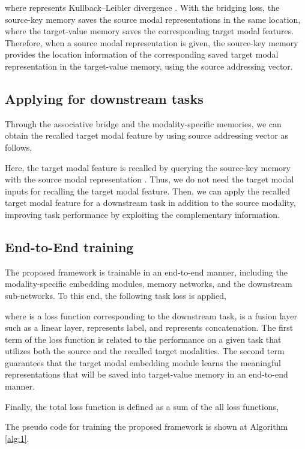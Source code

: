 \documentclass[10pt,twocolumn,letterpaper]{article}
\begin{document}
where  represents Kullback–Leibler divergence \cite{kullback1951kld}.
With the bridging loss, the source-key memory saves the source modal representations in the same location, where the target-value memory saves the corresponding target modal features. Therefore, when a source modal representation is given, the source-key memory provides the location information of the corresponding saved target modal representation in the target-value memory, using the source addressing vector.

\subsection{Applying for downstream tasks}
\vspace{-0.11cm}
Through the associative bridge and the modality-specific memories, we can obtain the recalled target modal feature  by using source addressing vector  as follows,


Here, the target modal feature  is recalled by querying the source-key memory  with the source modal representation . Thus, we do not need the target modal inputs for recalling the target modal feature. Then, we can apply the recalled target modal feature for a downstream task in addition to the source modality, improving task performance by exploiting the complementary information.

\subsection{End-to-End training}
The proposed framework is trainable in an end-to-end manner, including the modality-specific embedding modules, memory networks, and the downstream sub-networks. To this end, the following task loss is applied,

where  is a loss function corresponding to the downstream task,  is a fusion layer such as a linear layer,  represents label, and  represents concatenation. The first term of the loss function is related to the performance on a given task that utilizes both the source and the recalled target modalities. The second term guarantees that the target modal embedding module learns the meaningful representations that will be saved into target-value memory in an end-to-end manner.

Finally, the total loss function is defined as a sum of the all loss functions,

The pseudo code for training the proposed framework is shown at Algorithm \ref{alg:1}.
\end{document}
